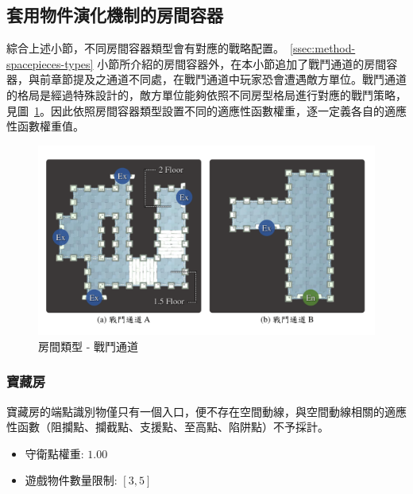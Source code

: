 \subsection{套用物件演化機制的房間容器}
\label{ssec:method-segments-appliedonvolumes}

綜合上述小節，不同房間容器類型會有對應的戰略配置。~\ref{ssec:method-spacepieces-types} 小節所介紹的房間容器外，在本小節追加了戰鬥通道的房間容器，與前章節提及之通道不同處，在戰鬥通道中玩家恐會遭遇敵方單位。戰鬥通道的格局是經過特殊設計的，敵方單位能夠依照不同房型格局進行對應的戰鬥策略，見圖~\ref{fig:roomtype-mainpath-extend}。因此依照房間容器類型設置不同的適應性函數權重，逐一定義各自的適應性函數權重值。

\begin{figure}[ht]
  \begin{center}
    \includegraphics[width=1.0\textwidth]{figures/roomtype-mainpath-extend.pdf}
    \caption{房間類型 - 戰鬥通道}
    \label{fig:roomtype-mainpath-extend}
  \end{center}
\end{figure}

\subsubsection{寶藏房}
\label{sssec:method-segments-appliedonvolumes-treasure}

寶藏房的端點識別物僅只有一個入口，便不存在空間動線，與空間動線相關的適應性函數（阻攔點、攔截點、支援點、至高點、陷阱點）不予採計。

\begin{itemize}
  \setlength\itemsep{-0.5em}
  \item 守衛點權重: $1.00$
  \item 遊戲物件數量限制: $[3, 5]$
\end{itemize}

